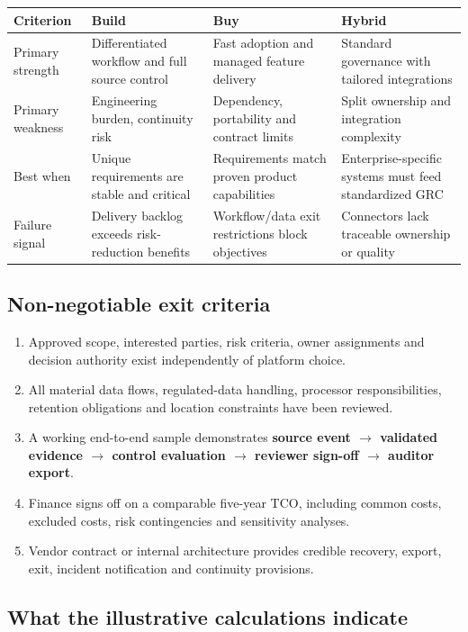 \documentclass[10pt,letterpaper]{article}
\begin{document}
\begin{tabularx}{\linewidth}{@{}L{1.08in}YYY@{}}
\toprule
\textbf{Criterion} & \textbf{Build} & \textbf{Buy} & \textbf{Hybrid}\\\midrule
Primary strength & Differentiated workflow and full source control & Fast adoption and managed feature delivery & Standard governance with tailored integrations\\
Primary weakness & Engineering burden, continuity risk & Dependency, portability and contract limits & Split ownership and integration complexity\\
Best when & Unique requirements are stable and critical & Requirements match proven product capabilities & Enterprise-specific systems must feed standardized GRC\\
Failure signal & Delivery backlog exceeds risk-reduction benefits & Workflow/data exit restrictions block objectives & Connectors lack traceable ownership or quality\\
\bottomrule
\end{tabularx}

\subsection{Non-negotiable exit criteria}
\begin{enumerate}
\item Approved scope, interested parties, risk criteria, owner assignments and decision authority exist independently of platform choice.
\item All material data flows, regulated-data handling, processor responsibilities, retention obligations and location constraints have been reviewed.
\item A working end-to-end sample demonstrates \textbf{source event $\rightarrow$ validated evidence $\rightarrow$ control evaluation $\rightarrow$ reviewer sign-off $\rightarrow$ auditor export}.
\item Finance signs off on a comparable five-year TCO, including common costs, excluded costs, risk contingencies and sensitivity analyses.
\item Vendor contract or internal architecture provides credible recovery, export, exit, incident notification and continuity provisions.
\end{enumerate}

\subsection{What the illustrative calculations indicate}
\end{document}
